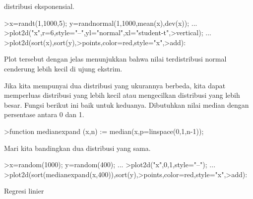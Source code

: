 \documentclass[a4paper,10pt]{article}
\begin{document}
\begin{eulernotebook}
\begin{eulercomment}
\begin{eulercomment}
\begin{eulercomment}
\begin{eulercomment}
\begin{eulercomment}
\begin{eulercomment}
\begin{eulercomment}
\begin{eulercomment}
\begin{eulercomment}
\begin{eulercomment}
\begin{eulercomment}
\begin{eulercomment}
\begin{eulercomment}
\begin{eulercomment}
\begin{eulercomment}
\begin{eulercomment}
\begin{eulercomment}
\begin{eulercomment}
\begin{eulercomment}
\begin{eulercomment}
\begin{eulercomment}
\begin{eulercomment}
\begin{eulercomment}
\begin{eulercomment}
\begin{eulercomment}
\begin{eulercomment}
\begin{eulercomment}
\begin{eulercomment}
\begin{eulercomment}
\begin{eulercomment}
\begin{eulercomment}
\begin{eulercomment}
\begin{eulercomment}
\begin{eulercomment}
\begin{eulercomment}
\begin{eulercomment}
\begin{eulercomment}
\begin{eulercomment}
\begin{eulercomment}
\begin{eulercomment}
\begin{eulercomment}
\begin{eulercomment}
\begin{eulercomment}
\begin{eulercomment}
\begin{eulercomment}
\begin{eulercomment}
\begin{eulercomment}
\begin{eulercomment}
\begin{eulercomment}
\begin{eulercomment}
\begin{eulercomment}
\begin{eulercomment}
\begin{eulercomment}
\begin{eulercomment}
\begin{eulercomment}
\begin{eulercomment}
\begin{eulercomment}
\begin{eulercomment}
\begin{eulercomment}
\begin{eulercomment}
\begin{eulercomment}
\begin{eulercomment}
\begin{eulercomment}
\begin{eulercomment}
\begin{eulercomment}
\begin{eulercomment}
\begin{eulercomment}
distribusi
eksponensial.
\end{eulercomment}
\begin{eulerprompt}
>x=randt(1,1000,5); y=randnormal(1,1000,mean(x),dev(x)); ...
>plot2d("x",r=6,style="--",yl="normal",xl="student-t",>vertical); ...
>plot2d(sort(x),sort(y),>points,color=red,style="x",>add):
\end{eulerprompt}
\begin{eulercomment}
Plot tersebut dengan jelas menunjukkan bahwa nilai terdistribusi
normal cenderung lebih kecil di ujung ekstrim.

Jika kita mempunyai dua distribusi yang ukurannya berbeda, kita dapat
memperluas distribusi yang lebih kecil atau mengecilkan distribusi
yang lebih besar. Fungsi berikut ini baik untuk keduanya. Dibutuhkan
nilai median dengan persentase antara 0 dan 1.
\end{eulercomment}
\begin{eulerprompt}
>function medianexpand (x,n) := median(x,p=linspace(0,1,n-1));
\end{eulerprompt}
\begin{eulercomment}
Mari kita bandingkan dua distribusi yang sama.
\end{eulercomment}
\begin{eulerprompt}
>x=random(1000); y=random(400); ...
>plot2d("x",0,1,style="--"); ...
>plot2d(sort(medianexpand(x,400)),sort(y),>points,color=red,style="x",>add):
\end{eulerprompt}
\begin{eulercomment}
Regresi linier 
\end{eulercomment}
\end{eulercomment}
\end{eulercomment}
\end{eulercomment}
\end{eulercomment}
\end{eulercomment}
\end{eulercomment}
\end{eulercomment}
\end{eulercomment}
\end{eulercomment}
\end{eulercomment}
\end{eulercomment}
\end{eulercomment}
\end{eulercomment}
\end{eulercomment}
\end{eulercomment}
\end{eulercomment}
\end{eulercomment}
\end{eulercomment}
\end{eulercomment}
\end{eulercomment}
\end{eulercomment}
\end{eulercomment}
\end{eulercomment}
\end{eulercomment}
\end{eulercomment}
\end{eulercomment}
\end{eulercomment}
\end{eulercomment}
\end{eulercomment}
\end{eulercomment}
\end{eulercomment}
\end{eulercomment}
\end{eulercomment}
\end{eulercomment}
\end{eulercomment}
\end{eulercomment}
\end{eulercomment}
\end{eulercomment}
\end{eulercomment}
\end{eulercomment}
\end{eulercomment}
\end{eulercomment}
\end{eulercomment}
\end{eulercomment}
\end{eulercomment}
\end{eulercomment}
\end{eulercomment}
\end{eulercomment}
\end{eulercomment}
\end{eulercomment}
\end{eulercomment}
\end{eulercomment}
\end{eulercomment}
\end{eulercomment}
\end{eulercomment}
\end{eulercomment}
\end{eulercomment}
\end{eulercomment}
\end{eulercomment}
\end{eulercomment}
\end{eulercomment}
\end{eulercomment}
\end{eulercomment}
\end{eulercomment}
\end{eulercomment}
\end{eulercomment}
\end{eulernotebook}
\end{document}
